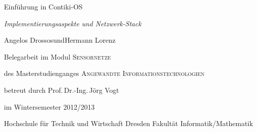 \begin{titlepage}
	\sffamily
	\parbox[b][\textheight]{\dimexpr\textwidth-5em}{
		\raggedleft
		\vspace{2em}
		{\Huge Einführung in Contiki-OS}\par
		\vspace{1em}
		{\Large\itshape Implementierungsaspekte und Netzwerk-Stack}\par
		\vspace{2em}
		{Angelos Drossos\linebreak und\linebreak Hermann Lorenz}\par

		\vfill

		Belegarbeit im Modul\linebreak
		{\scshape\Large Sensornetze}

		\vspace{1cm}

		des Masterstudienganges\linebreak
		{\scshape\Large Angewandte Informationstechnologien}

		\vspace{1cm}

		betreut durch Prof.\,Dr.-Ing.\,Jörg Vogt

		im Wintersemester 2012/2013

		\vfill

		Hochschule für Technik und Wirtschaft Dresden\linebreak
		Fakultät Informatik/Mathematik
	}
\end{titlepage}
